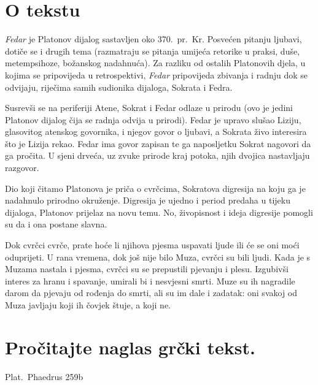 


\section*{O tekstu}

\textit{Fedar} je Platonov dijalog sastavljen oko 370.\ pr.~Kr. Posvećen pitanju ljubavi, dotiče se i drugih tema (razmatraju se pitanja umijeća retorike u praksi, duše, metempsihoze, božanskog nadahnuća). Za razliku od ostalih Platonovih djela, u kojima se pripovijeda u retrospektivi, \textit{Fedar} pripovijeda zbivanja i radnju dok se odvijaju, riječima samih sudionika dijaloga, Sokrata i Fedra.

Susrevši se na periferiji Atene, Sokrat i Fedar odlaze u prirodu (ovo je jedini Platonov dijalog čija se radnja odvija u prirodi). Fedar je upravo slušao Liziju, glasovitog atenskog govornika, i njegov govor o ljubavi, a Sokrata živo interesira što je Lizija rekao. Fedar ima govor zapisan te ga naposljetku Sokrat nagovori da ga pročita. U sjeni drveća, uz zvuke prirode kraj potoka, njih dvojica nastavljaju razgovor. 

Dio koji čitamo Platonova je priča o cvrčcima, Sokratova digresija na koju ga je nadahnulo prirodno okruženje. Digresija je ujedno i period predaha u tijeku dijaloga, Platonov prijelaz na novu temu. No, živopisnost i ideja digresije pomogli su da i ona postane slavna. 

Dok cvrčci cvrče, prate hoće li njihova pjesma uspavati ljude ili će se oni moći oduprijeti. U rana vremena, dok još nije bilo Muza, cvrčci su bili ljudi. Kada je s Muzama nastala i pjesma, cvrčci su se prepustili pjevanju i plesu. Izgubivši interes za hranu i spavanje, umirali bi i nesvjesni smrti. Muze su ih nagradile darom da pjevaju od rođenja do smrti, ali su im dale i zadatak: oni svakoj od Muza javljaju koji ih čovjek štuje, a koji ne.


\newpage

\section*{Pročitajte naglas grčki tekst.}

Plat.\ Phaedrus 259b


